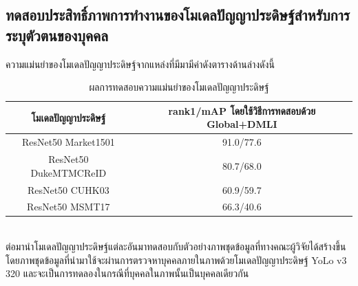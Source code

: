 \subsection{ทดสอบประสิทธิ์ภาพการทำงานของโมเดลปัญญาประดิษฐ์สำหรับการระบุตัวตนของบุคคล}
ความแม่นยำของโมเดลปัญญาประดิษฐ์จากแหล่งที่มีมามีค่าดังตารางด้านล่างดังนี้
\begin{table}[!ht]
    \centering
    \begin{tabular}{|c|c|}
            \hline
            {โมเดลปัญญาประดิษฐ์}&{rank1/mAP โดยใช้วิธีการทดสอบด้วย Global+DMLI}				\\
            \hline
            ResNet50 Market1501	 			& 91.0/77.6								\\
            ResNet50 DukeMTMCReID			& 80.7/68.0								\\
            ResNet50 CUHK03				& 60.9/59.7								\\
            ResNet50 MSMT17				& 66.3/40.6								\\
        \hline
    \end{tabular}
    \caption{ผลการทดสอบความแม่นยำของโมเดลปัญญาประดิษฐ์}
    \label{tab: Accuracy of model ReID}
\end{table}
\\
ต่อมานำโมเดลปัญญาประดิษฐ์แต่ละอันมาทดสอบกับตัวอย่างภาพชุดข้อมูลที่ทางคณะผู้วิจัยได้สร้างขึ้น โดยภาพชุดข้อมูลที่นำมาใช้จะผ่านการตรวจหาบุคคลภายในภาพด้วยโมเดลปัญญาประดิษฐ์ YoLo v3 320 และจะเป็นการทดลองในกรณีที่บุคคลในภาพนั้นเป็นบุคคลเดียวกัน
